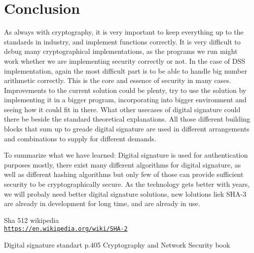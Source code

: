 \documentclass[12pt]{report}
\begin{document}
\section*{Conclusion}
As always with cryptography, it is very important to keep everything up to the standards in industry, and implement functions correctly. It is very difficult to debug many cryptographical implementations, as the programs we run might work whether we are implementing security correctly or not. In the case of DSS implementation, again the most difficult part is to be able to handle big number arithmetic correctly. This is the core and essence of security in many cases. Improvements to the current solution could be plenty, try to use the solution by implementing it in a bigger program, incorporating into bigger environment and seeing how it could fit in there. What other usecases of digital signature could there be beside the standard theoretical explanations. All those different building blocks that sum up to greade digital signature are used in different arrangements and combinations to supply for different demands.

To summarize what we have learned: Digital signature is used for authentication purposes mostly, there exist many different algorithms for digital signature, as well as different hashing algorithms but only few of those can provide sufficient security to be cryptographically secure. As the technology gets better with years, we will probaly need better digital signature solutions, new lolutions liek SHA-3 are already in development for long time, and are already in use. 

\begin{thebibliography}{9}

  Sha 512 wikipedia
  \\\texttt{\url{https://en.wikipedia.org/wiki/SHA-2}}

  Digital signature standart p.405
  Cryptography and Network Security book
  
\end{thebibliography}
\end{document}
